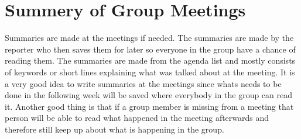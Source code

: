 \section{Summery of Group Meetings}
Summaries are made at the meetings if needed. The summaries are made by the reporter who then saves them for later so everyone in the group have a chance of reading them. 
The summaries are made from the agenda list and mostly consists of keywords or short lines explaining what was talked about at the meeting.
It is a very good idea to write summaries at the meetings since whats needs to be done in the following week will be saved where everybody in the group can read it. 
Another good thing is that if a group member is missing from a meeting  that person will be able to read what happened in the meeting afterwards and therefore still keep up about what is happening in the group.
